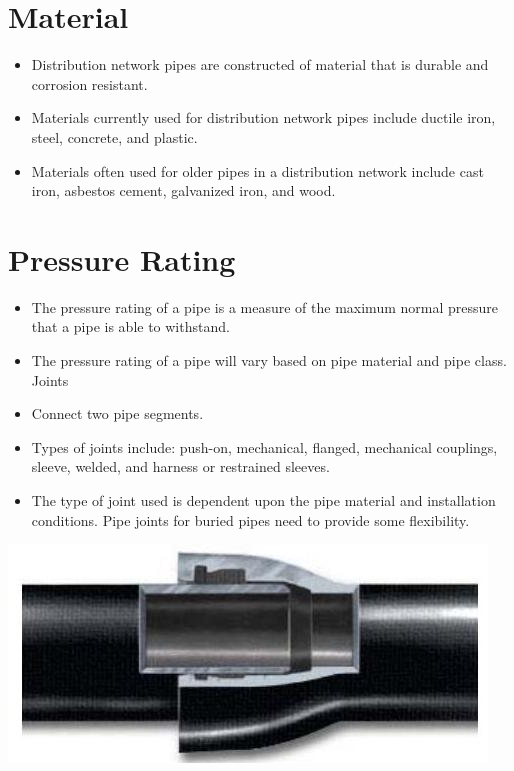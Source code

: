 \documentclass[10pt]{article}
\begin{document}
\section{Material}
\begin{itemize}
  \item Distribution network pipes are constructed of material that is durable and corrosion resistant.

  \item Materials currently used for distribution network pipes include ductile iron, steel, concrete, and plastic.

  \item Materials often used for older pipes in a distribution network include cast iron, asbestos cement, galvanized iron, and wood.

\end{itemize}
\section{Pressure Rating}
\begin{itemize}
  \item The pressure rating of a pipe is a measure of the maximum normal pressure that a pipe is able to withstand.

  \item The pressure rating of a pipe will vary based on pipe material and pipe class. Joints

  \item Connect two pipe segments.

  \item Types of joints include: push-on, mechanical, flanged, mechanical couplings, sleeve, welded, and harness or restrained sleeves.

  \item The type of joint used is dependent upon the pipe material and installation conditions. Pipe joints for buried pipes need to provide some flexibility.

\end{itemize}
\includegraphics[max width=\textwidth]{PushonJoint}
\end{document}
